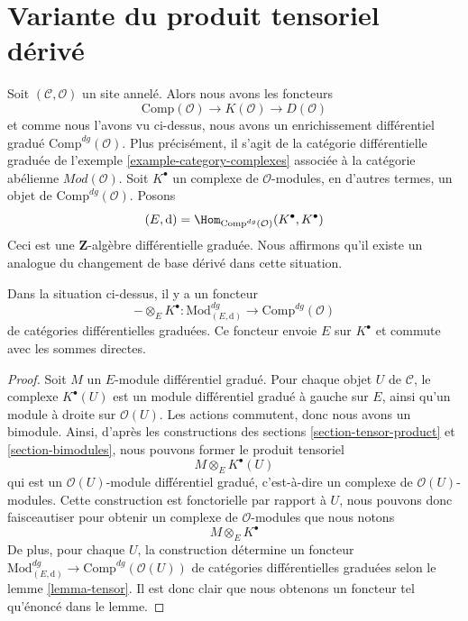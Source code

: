 \section{Variante du produit tensoriel dérivé}
\label{section-variant-base-change}

\noindent
Soit $(\mathcal{C}, \mathcal{O})$ un site annelé. Alors nous avons les foncteurs
$$
\text{Comp}(\mathcal{O}) \to K(\mathcal{O}) \to D(\mathcal{O})
$$
et comme nous l'avons vu ci-dessus, nous avons un enrichissement
différentiel gradué $\text{Comp}^{dg}(\mathcal{O})$. Plus précisément, il s'agit
de la catégorie différentielle graduée de l'exemple
\ref{example-category-complexes} associée à la catégorie abélienne
$\textit{Mod}(\mathcal{O})$. Soit $K^\bullet$ un complexe de $\mathcal{O}$-modules, en d'autres
termes, un objet de $\text{Comp}^{dg}(\mathcal{O})$. Posons
$$
(E, \text{d}) =
\Hom_{\text{Comp}^{dg}(\mathcal{O})}(K^\bullet, K^\bullet)
$$
Ceci est une $\mathbf{Z}$-algèbre différentielle graduée. Nous affirmons qu'il
existe un analogue du changement de base dérivé dans cette situation.

\begin{lemma}
\label{lemma-tensor-with-complex}
Dans la situation ci-dessus, il y a un foncteur
$$
- \otimes_E K^\bullet :
\text{Mod}^{dg}_{(E, \text{d})}
\longrightarrow
\text{Comp}^{dg}(\mathcal{O})
$$
de catégories différentielles graduées. Ce foncteur envoie $E$ sur $K^\bullet$ et
commute avec les sommes directes.
\end{lemma}

\begin{proof}
Soit $M$ un $E$-module différentiel gradué. Pour chaque objet $U$ de
$\mathcal{C}$, le complexe $K^\bullet(U)$ est un module différentiel gradué à
gauche sur $E$, ainsi qu'un module à droite sur $\mathcal{O}(U)$. Les
actions commutent, donc nous avons un bimodule.
Ainsi, d'après les constructions des
sections \ref{section-tensor-product} et \ref{section-bimodules}, nous
pouvons former le produit tensoriel
$$
M \otimes_E K^\bullet(U)
$$
qui est un $\mathcal{O}(U)$-module différentiel gradué, c'est-à-dire un complexe
de $\mathcal{O}(U)$-modules. Cette construction est fonctorielle par rapport à $U$,
nous pouvons donc faisceautiser pour obtenir un complexe de $\mathcal{O}$-modules
que nous notons
$$
M \otimes_E K^\bullet
$$
De plus, pour chaque $U$, la construction détermine un foncteur
$\text{Mod}^{dg}_{(E, \text{d})} \to \text{Comp}^{dg}(\mathcal{O}(U))$ de
catégories différentielles graduées selon le lemme \ref{lemma-tensor}.
Il est donc clair que nous obtenons un foncteur tel qu'énoncé dans le lemme.
\end{proof}

